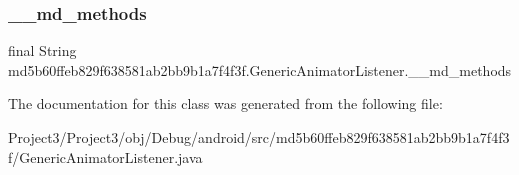 \subsubsection{\texorpdfstring{\+\_\+\+\_\+md\+\_\+methods}{\_\_md\_methods}}
{\footnotesize\ttfamily final String md5b60ffeb829f638581ab2bb9b1a7f4f3f.\+Generic\+Animator\+Listener.\+\_\+\+\_\+md\+\_\+methods\hspace{0.3cm}{\ttfamily [static]}}



The documentation for this class was generated from the following file\+:\begin{DoxyCompactItemize}
\item 
Project3/\+Project3/obj/\+Debug/android/src/md5b60ffeb829f638581ab2bb9b1a7f4f3f/Generic\+Animator\+Listener.\+java\end{DoxyCompactItemize}
